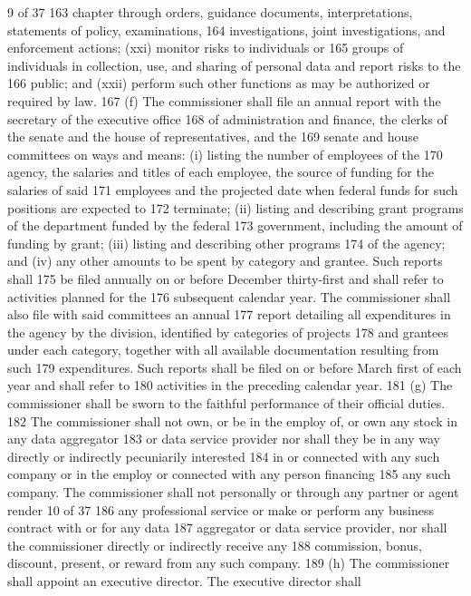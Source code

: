 9 of 37
163 chapter through orders, guidance documents, interpretations, statements of policy, examinations,
164 investigations, joint investigations, and enforcement actions; (xxi) monitor risks to individuals or
165 groups of individuals in collection, use, and sharing of personal data and report risks to the
166 public; and (xxii) perform such other functions as may be authorized or required by law.
167 (f) The commissioner shall file an annual report with the secretary of the executive office
168 of administration and finance, the clerks of the senate and the house of representatives, and the
169 senate and house committees on ways and means: (i) listing the number of employees of the
170 agency, the salaries and titles of each employee, the source of funding for the salaries of said
171 employees and the projected date when federal funds for such positions are expected to
172 terminate; (ii) listing and describing grant programs of the department funded by the federal
173 government, including the amount of funding by grant; (iii) listing and describing other programs
174 of the agency; and (iv) any other amounts to be spent by category and grantee. Such reports shall
175 be filed annually on or before December thirty-first and shall refer to activities planned for the
176 subsequent calendar year. The commissioner shall also file with said committees an annual
177 report detailing all expenditures in the agency by the division, identified by categories of projects
178 and grantees under each category, together with all available documentation resulting from such
179 expenditures. Such reports shall be filed on or before March first of each year and shall refer to
180 activities in the preceding calendar year.
181 (g) The commissioner shall be sworn to the faithful performance of their official duties.
182 The commissioner shall not own, or be in the employ of, or own any stock in any data aggregator
183 or data service provider nor shall they be in any way directly or indirectly pecuniarily interested
184 in or connected with any such company or in the employ or connected with any person financing
185 any such company. The commissioner shall not personally or through any partner or agent render
10 of 37
186 any professional service or make or perform any business contract with or for any data
187 aggregator or data service provider, nor shall the commissioner directly or indirectly receive any
188 commission, bonus, discount, present, or reward from any such company.
189 (h) The commissioner shall appoint an executive director. The executive director shall
